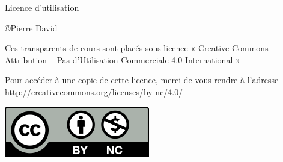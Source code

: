 \begin {frame} {Licence d'utilisation}

    \fB

    \copyright Pierre David

    \vspace* {3mm}

    Ces transparents de cours sont placés sous licence « Creative
    Commons Attribution -- Pas d’Utilisation Commerciale 4.0
    International »

    \vspace* {3mm}

    Pour accéder à une copie de cette licence,
    merci de vous rendre à l'adresse
    \url {http://creativecommons.org/licenses/by-nc/4.0/}

    \vspace* {3mm}

    \includegraphics [scale=.7] {by-nc}
\end {frame}
